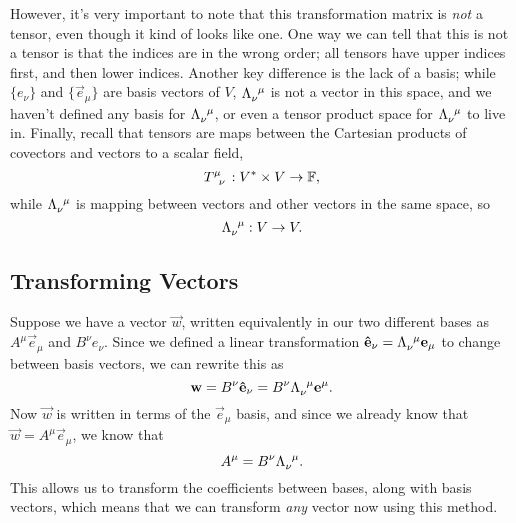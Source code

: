 However, it's very important to note that this transformation matrix is \emph{not} a tensor, even though it kind of looks like one.
One way we can tell that this is not a tensor is that the indices are in the wrong order; all tensors have upper indices first, and then lower indices.
Another key difference is the lack of a basis; while $\{\unit{e}_\nu\}$ and $\{\vec{e}_\mu\}$ are basis vectors of $V$, $\tensor{\Lambda}{_\nu^\mu}$ is not a vector in this space, and we haven't defined any basis for $\tensor{\Lambda}{_\nu^\mu}$, or even a tensor product space for $\tensor{\Lambda}{_\nu^\mu}$ to live in.
Finally, recall that tensors are maps between the Cartesian products of covectors and vectors to a scalar field,
\[ \tensor{T}{^\mu_\nu} : V^* \times V \to \mathbb{F}, \]
while $\tensor{\Lambda}{_\nu^\mu}$ is mapping between vectors and other vectors in the same space, so 
\[ \tensor{\Lambda}{_\nu^\mu} : V \to V. \]

\subsection{Transforming Vectors}
Suppose we have a vector $\vec{w}$, written equivalently in our two different bases as $A^\mu \vec{e}_\mu$ and $B^\nu \unit{e}_\nu$.
Since we defined a linear transformation $\unit{e}_\nu = \tensor{\Lambda}{_\nu^\mu} \vec{e}_\mu$ to change between basis vectors, we can rewrite this as
\[ \vec{w} = B^\nu \unit{e}_\nu = B^\nu \tensor{\Lambda}{_\nu^\mu} \vec{e}^\mu. \]
Now $\vec{w}$ is written in terms of the $\vec{e}_\mu$ basis, and since we already know that $\vec{w} = A^\mu \vec{e}_\mu$, we know that
\[ A^\mu = B^\nu\tensor{\Lambda}{_\nu^\mu}. \]
This allows us to transform the coefficients between bases, along with basis vectors, which means that we can transform \emph{any} vector now using this method.


